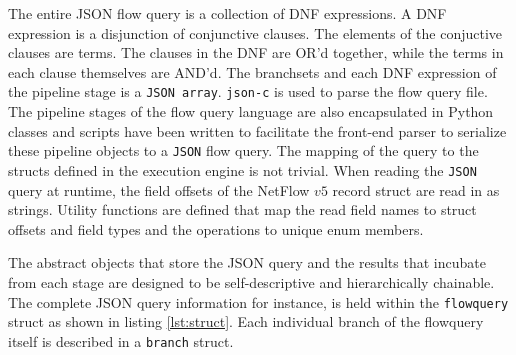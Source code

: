 The entire JSON flow query is a collection of \ac{DNF} expressions. A \ac{DNF}
expression is a disjunction of conjunctive clauses. The elements of the
conjuctive clauses are terms. The clauses in the \ac{DNF} are OR'd together,
while the terms in each clause themselves are AND'd. The branchsets and each
\ac{DNF} expression of the pipeline stage is a \texttt{JSON array}.
\texttt{json-c} \cite{jsonc} is used to parse the flow query file. The
pipeline stages of the flow query language are also encapsulated in Python
classes and scripts have been written to facilitate the front-end parser to
serialize these pipeline objects to a \texttt{JSON} flow query.  The mapping
of the query to the structs defined in the execution engine is
not trivial. When reading the \texttt{JSON} query at runtime, the field
offsets of the NetFlow $v5$ record struct are read in as strings.  Utility
functions are defined that map the read field names to struct offsets and
field types and the operations to unique enum members.

The abstract objects that store the JSON query and the results that incubate
from each stage are designed to be self-descriptive and hierarchically
chainable.  The complete JSON query information for instance, is held within
the \texttt{flowquery} struct as shown in listing \ref{lst:struct}. Each
individual branch of the flowquery itself is described in a \texttt{branch}
struct.

